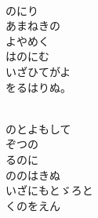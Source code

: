 \documentclass[10pt,b5j]{tarticle} %
\begin{document}
\vspace{1.5em} %
\newcommand{\linespace}{0.5em} %
\newcommand{\blocksize}{0.5\hsize} %
\newcommand{\itemmargin}{3em} %
\begin{enumerate} %
    \setlength{\itemindent}{\itemmargin} %
    \begin{minipage}[c]{\blocksize}
    
        \vspace{\linespace}
        \item~\\
        のにり\\
        あまねきの\\
        よやめく\\
        はのにむ\\
        いざひてがよ\\
        をるはりぬ。
        
    \end{minipage}
    \begin{minipage}[c]{\blocksize}
        
        \vspace{\linespace}
        \item~\\
        のとよもして\\
        ぞつの\\
        るのに\\
        ののはきぬ\\
        いざにもとゞろと\\
        くのをえん
    
    \end{minipage}
\end{enumerate} %
\end{document}
